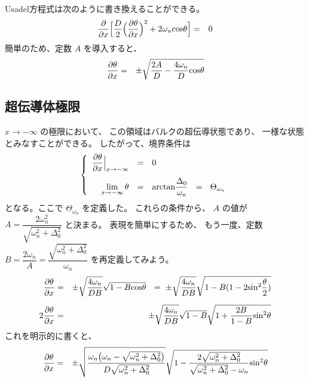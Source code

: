\documentclass[uplatex,a4j,12pt,dvipdfmx]{jsarticle}
\begin{document}
Usadel方程式は次のように書き換えることができる。
\begin{eqnarray}
	\dfrac{\partial}{\partial x}
	\Big[
		\dfrac{D}{2}
		\Big( \dfrac{\partial \theta}{\partial x} \Big)^{2}
		+
		2 \omega_{n}
		{\rm cos} \theta
		\Big]
	&=&
	0
\end{eqnarray}
簡単のため、定数 $A$ を導入すると、
\begin{eqnarray}
	\dfrac{\partial \theta}{\partial x}
	&=&
	\pm
	\sqrt{
		\dfrac{2A}{D}
		-
		\dfrac{4 \omega_{n}}{D}
		{\rm cos} \theta
	}
\end{eqnarray}
\subsection{超伝導体極限}

$x \to - \infty$ の極限において、
この領域はバルクの超伝導状態であり、
一様な状態とみなすことができる。
したがって、境界条件は
\begin{eqnarray}
	\left\{
	\begin{array}{rcl}
		\dfrac{\partial \theta}{\partial x} \Big|_{x \to - \infty}
		 & = & 0
		\\[4mm]
		\displaystyle \lim_{x \to - \infty} \theta
		 & = &
		{\rm arctan} \dfrac{\Delta_{0}}{ \omega_{n} }
		\ \ = \ \
		\Theta_{\omega_{n}}
	\end{array}
	\right.
\end{eqnarray}
となる。ここで $\Theta_{\omega_{n}}$ を定義した。
これらの条件から、 $A$ の値が
$\displaystyle A=\dfrac{2 \omega_{n}^{2}}{ \sqrt{ \omega_{n}^{2} + \Delta_{0}^{2} } }$
と決まる。
表現を簡単にするため、
もう一度、定数
$B=\dfrac{2 \omega_{n}}{A} = \dfrac{ \sqrt{ \omega_{n}^{2} + \Delta_{0}^{2} }}{\omega_{n}}$
を再定義してみよう。
\begin{eqnarray}
	\dfrac{\partial \theta}{\partial x}
	&=&
	\pm
	\sqrt{ \dfrac{4 \omega_{n}}{DB} }
	\sqrt{ 1 - B {\rm cos} \theta }
	\ \ = \
	\pm
	\sqrt{ \dfrac{4 \omega_{n}}{DB} }
	\sqrt{ 1 - B (1 - 2 {\rm sin}^{2} \dfrac{\theta}{2} ) }
	\\[2mm]
	2
	\dfrac{\partial \theta}{\partial x}
	&=&
	\pm
	\sqrt{ \dfrac{4 \omega_{n}}{DB} }
	\sqrt{ 1- B }
	\sqrt{ 1 + \dfrac{2B}{1-B} {\rm sin}^{2} \theta }
\end{eqnarray}
これを明示的に書くと、
\begin{eqnarray}
	\dfrac{\partial \theta}{\partial x}
	&=&
	\pm
	\sqrt{ \dfrac{ \omega_{n} \big( \omega_{n} - \sqrt{\omega_{n}^{2} + \Delta_{0}^{2}} \big) }{ D \sqrt{\omega_{n}^{2} + \Delta_{0}^{2}} } }
	\sqrt{ 1 - \dfrac{ 2 \sqrt{\omega_{n}^{2} + \Delta_{0}^{2}} }{ \sqrt{\omega_{n}^{2} + \Delta_{0}^{2}} - \omega_{n} } {\rm sin}^{2} \theta }
\end{eqnarray}
\end{document}
